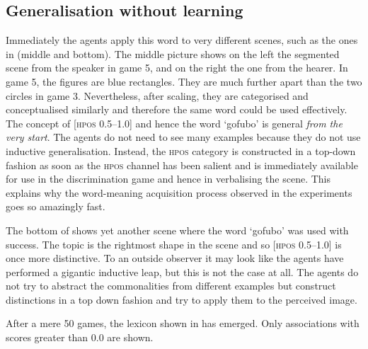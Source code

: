 \subsection{Generalisation without learning}

Immediately the agents apply this word to very 
different scenes, such as the ones in  (middle and bottom). The middle picture
shows on the left the segmented scene
from the speaker in game 5, and on the right the one
from the hearer. In game 5, the figures are blue
rectangles. They are much further apart than 
the two circles in game 3. Nevertheless, 
after scaling, they are categorised and
conceptualised similarly and therefore
the same word could be used effectively. The concept 
of [\textsc{hpos} 0.5–1.0] and hence the word `gofubo' 
is general {\itshape from the very start}. 
The agents do not need to see many examples because they do 
not use inductive generalisation. Instead, 
the \textsc{hpos} category is constructed in a top-down fashion 
as soon as the \textsc{hpos} channel has been salient
and is immediately available for use in the 
discrimination game and hence in verbalising 
the scene. This explains why the word-meaning acquisition
process observed in the experiments goes so 
amazingly fast.

The bottom of 
shows yet another scene where the word `gofubo' 
was used with success. The topic is the rightmost
shape in the scene and so [\textsc{hpos} 0.5–1.0] is once more 
distinctive. To an outside observer it may look 
like the agents have performed a gigantic inductive
leap, but this is not the case at all. The agents
do not try to abstract the commonalities from 
different examples but construct distinctions in a top 
down fashion and try to apply them to the perceived image. 

After a mere 50 games, the lexicon shown in  has emerged. Only
associations with scores greater than 0.0 are shown. 

